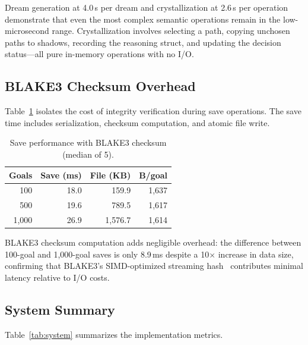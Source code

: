\documentclass[10pt, twocolumn]{article}
\begin{document}
Dream generation at 4.0\,\textmu s per dream and crystallization at 2.6\,\textmu s per operation demonstrate that even the most complex semantic operations remain in the low-microsecond range. Crystallization involves selecting a path, copying unchosen paths to shadows, recording the reasoning struct, and updating the decision status---all pure in-memory operations with no I/O.

\subsection{BLAKE3 Checksum Overhead}
\label{sec:checksum}

Table~\ref{tab:checksum} isolates the cost of integrity verification during save operations. The save time includes serialization, checksum computation, and atomic file write.

\begin{table}[t]
\caption{Save performance with BLAKE3 checksum (median of 5).}
\label{tab:checksum}
\centering
\small
\begin{tabular}{@{}rrrr@{}}
\toprule
\textbf{Goals} & \textbf{Save (ms)} & \textbf{File (KB)} & \textbf{B/goal} \\
\midrule
100 & 18.0 & 159.9 & 1{,}637 \\
500 & 19.6 & 789.5 & 1{,}617 \\
1{,}000 & 26.9 & 1{,}576.7 & 1{,}614 \\
\bottomrule
\end{tabular}
\end{table}

BLAKE3 checksum computation adds negligible overhead: the difference between 100-goal and 1{,}000-goal saves is only 8.9\,ms despite a 10$\times$ increase in data size, confirming that BLAKE3's SIMD-optimized streaming hash~\cite{blake3_2020} contributes minimal latency relative to I/O costs.

\subsection{System Summary}
\label{sec:sys_summary}

Table~\ref{tab:system} summarizes the implementation metrics.
\end{document}

